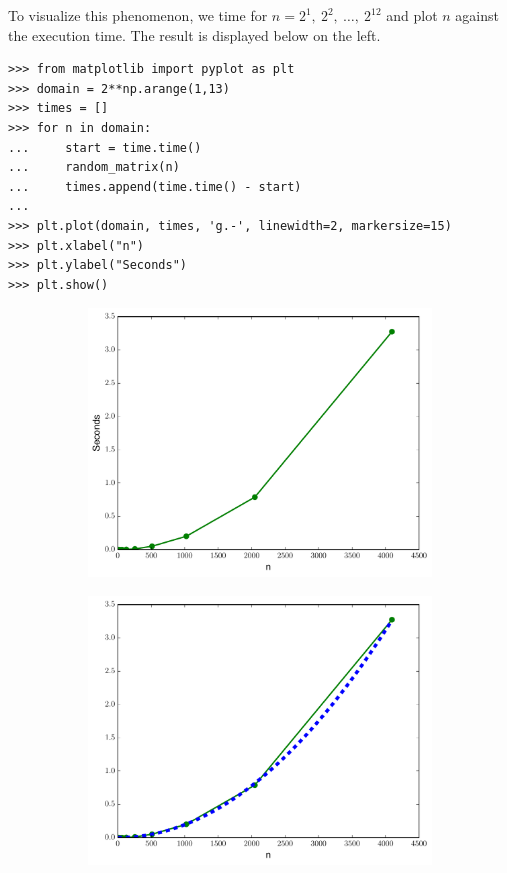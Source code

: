 To visualize this phenomenon, we time  for $n = 2^1,\ 2^2,\ \ldots,\ 2^{12}$ and plot $n$ against the execution time.
The result is displayed below on the left.%

\begin{lstlisting}
>>> from matplotlib import pyplot as plt
>>> domain = 2**np.arange(1,13)
>>> times = []
>>> for n in domain:
...     start = time.time()
...     random_matrix(n)
...     times.append(time.time() - start)
...
>>> plt.plot(domain, times, 'g.-', linewidth=2, markersize=15)
>>> plt.xlabel("n")
>>> plt.ylabel("Seconds")
>>> plt.show()
\end{lstlisting}

\begin{figure}[H] %
\captionsetup[subfigure]{justification=centering}
\centering
\begin{subfigure}{.5\textwidth}
    \centering
    \includegraphics[width=\linewidth]{time_random_matrix1.pdf}
\end{subfigure}%
\begin{subfigure}{.5\textwidth}
    \centering
    \includegraphics[width=\linewidth]{time_random_matrix2.pdf}
\end{subfigure}
\end{figure}

